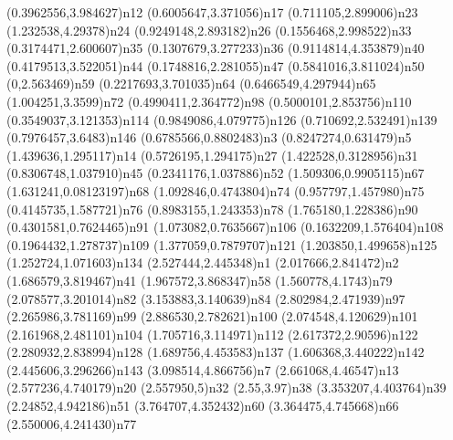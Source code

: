 \dotnode[](0.3962556,3.984627){n12}
\dotnode[](0.6005647,3.371056){n17}
\dotnode[](0.711105,2.899006){n23}
\dotnode[](1.232538,4.29378){n24}
\dotnode[](0.9249148,2.893182){n26}
\dotnode[](0.1556468,2.998522){n33}
\dotnode[fillcolor=gray](0.3174471,2.600607){n35}
\dotnode[](0.1307679,3.277233){n36}
\dotnode[](0.9114814,4.353879){n40}
\dotnode[](0.4179513,3.522051){n44}
\dotnode[](0.1748816,2.281055){n47}
\dotnode[](0.5841016,3.811024){n50}
\dotnode[](0,2.563469){n59}
\dotnode[](0.2217693,3.701035){n64}
\dotnode[](0.6466549,4.297944){n65}
\dotnode[](1.004251,3.3599){n72}
\dotnode[](0.4990411,2.364772){n98}
\dotnode[](0.5000101,2.853756){n110}
\dotnode[](0.3549037,3.121353){n114}
\dotnode[](0.9849086,4.079775){n126}
\dotnode[](0.710692,2.532491){n139}
\dotnode[](0.7976457,3.6483){n146}
\dotnode[](0.6785566,0.8802483){n3}
\dotnode[](0.8247274,0.631479){n5}
\dotnode[](1.439636,1.295117){n14}
\dotnode[fillcolor=gray](0.5726195,1.294175){n27}
\dotnode[](1.422528,0.3128956){n31}
\dotnode[](0.8306748,1.037910){n45}
\dotnode[](0.2341176,1.037886){n52}
\dotnode[](1.509306,0.9905115){n67}
\dotnode[](1.631241,0.08123197){n68}
\dotnode[](1.092846,0.4743804){n74}
\dotnode[](0.957797,1.457980){n75}
\dotnode[](0.4145735,1.587721){n76}
\dotnode[](0.8983155,1.243353){n78}
\dotnode[](1.765180,1.228386){n90}
\dotnode[](0.4301581,0.7624465){n91}
\dotnode[](1.073082,0.7635667){n106}
\dotnode[](0.1632209,1.576404){n108}
\dotnode[](0.1964432,1.278737){n109}
\dotnode[](1.377059,0.7879707){n121}
\dotnode[](1.203850,1.499658){n125}
\dotnode[](1.252724,1.071603){n134}
\dotnode[](2.527444,2.445348){n1}
\dotnode[fillcolor=gray](2.017666,2.841472){n2}
\dotnode[](1.686579,3.819467){n41}
\dotnode[](1.967572,3.868347){n58}
\dotnode[](1.560778,4.1743){n79}
\dotnode[](2.078577,3.201014){n82}
\dotnode[](3.153883,3.140639){n84}
\dotnode[](2.802984,2.471939){n97}
\dotnode[](2.265986,3.781169){n99}
\dotnode[](2.886530,2.782621){n100}
\dotnode[](2.074548,4.120629){n101}
\dotnode[](2.161968,2.481101){n104}
\dotnode[](1.705716,3.114971){n112}
\dotnode[](2.617372,2.90596){n122}
\dotnode[](2.280932,2.838994){n128}
\dotnode[](1.689756,4.453583){n137}
\dotnode[](1.606368,3.440222){n142}
\dotnode[](2.445606,3.296266){n143}
\dotnode[fillcolor=gray](3.098514,4.866756){n7}
\dotnode[](2.661068,4.46547){n13}
\dotnode[](2.577236,4.740179){n20}
\dotnode[](2.557950,5){n32}
\dotnode[](2.55,3.97){n38}
\dotnode[](3.353207,4.403764){n39}
\dotnode[](2.24852,4.942186){n51}
\dotnode[](3.764707,4.352432){n60}
\dotnode[](3.364475,4.745668){n66}
\dotnode[](2.550006,4.241430){n77}
